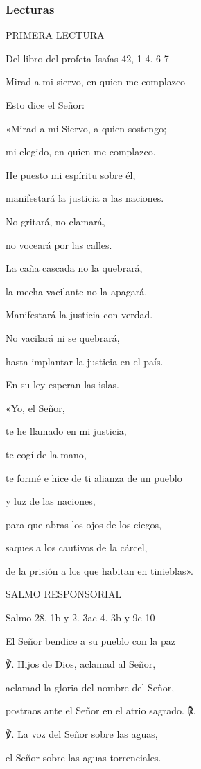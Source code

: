 \documentclass[]{article}
\begin{document}
\subsubsection{Lecturas}\label{lecturas-12}

PRIMERA LECTURA

Del libro del profeta Isaías 42, 1-4. 6-7

Mirad a mi siervo, en quien me complazco

Esto dice el Señor:

«Mirad a mi Siervo, a quien sostengo;

mi elegido, en quien me complazco.

He puesto mi espíritu sobre él,

manifestará la justicia a las naciones.

No gritará, no clamará,

no voceará por las calles.

La caña cascada no la quebrará,

la mecha vacilante no la apagará.

Manifestará la justicia con verdad.

No vacilará ni se quebrará,

hasta implantar la justicia en el país.

En su ley esperan las islas.

«Yo, el Señor,

te he llamado en mi justicia,

te cogí de la mano,

te formé e hice de ti alianza de un pueblo

y luz de las naciones,

para que abras los ojos de los ciegos,

saques a los cautivos de la cárcel,

de la prisión a los que habitan en tinieblas».

SALMO RESPONSORIAL

Salmo 28, 1b y 2. 3ac-4. 3b y 9c-10

El Señor bendice a su pueblo con la paz

℣. Hijos de Dios, aclamad al Señor,

aclamad la gloria del nombre del Señor,

postraos ante el Señor en el atrio sagrado. ℟.

℣. La voz del Señor sobre las aguas,

el Señor sobre las aguas torrenciales.
\end{document}
